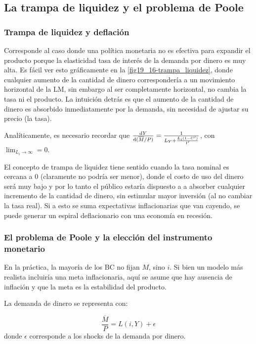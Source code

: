 \documentclass[DeGregorioResumen]{subfiles}
\begin{document}
\subsection{La trampa de liquidez y el problema de Poole}

\subsubsection{Trampa de liquidez y deflación}

Corresponde al caso donde una política monetaria no es efectiva para expandir el producto porque la elasticidad tasa de interés de la demanda por dinero es muy alta. Es fácil ver esto gráficamente en la \autoref{fig19_16-trampa_liquidez}, donde cualquier aumento de la cantidad de dinero correspondería a un movimiento horizontal de la LM, sin embargo al ser completamente horizontal, no cambia la tasa ni el producto. La intuición detrás es que el aumento de la cantidad de dinero es absorbido inmediatamente por la demanda, sin necesidad de ajustar su precio (la tasa).



Analíticamente, es necesario recordar que $\frac{\mathrm{d}Y}{\mathrm{d}(\overline M/P)} = \frac{1}{L_Y + \frac{L_i(1-C')}{I'}}$, con $\lim_{L_i \to \infty} = 0$.

El concepto de trampa de liquidez tiene sentido cuando la tasa nominal es cercana a 0 (claramente no podría ser menor), donde el costo de uso del dinero será muy bajo y por lo tanto el público estaría dispuesto a a absorber cualquier incremento de la cantidad de dinero, sin estimular mayor inversión (al no cambiar la tasa real). Si a esto se suma expectativas inflacionarias que van cayendo, se puede generar un espiral deflacionario con una economía en recesión.

\subsubsection{El problema de Poole y la elección del instrumento monetario}

En la práctica, la mayoría de los BC no fijan $M$, sino $i$. Si bien un modelo más realista incluiría una meta inflacionaria, aquí se asume que hay ausencia de inflación y que la meta es la estabilidad del producto.


La demanda de dinero se representa con:

\[
\frac{\overline M}{P} = L(i,Y) + \epsilon
\]
donde $\epsilon$ corresponde a los shocks de la demanda por dinero.
\end{document}
